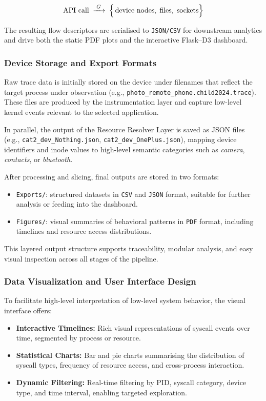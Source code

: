 \documentclass[a4paper,12pt]{report}
\begin{document}
\[
  \text{API call} \;\xrightarrow{\;G\;}\;
  \Bigl\{\,
     \text{device nodes},\;
     \text{files},\;
     \text{sockets}
  \Bigr\}
\]

\noindent
The resulting flow descriptors are serialised to
\texttt{JSON/CSV} for downstream analytics and drive both the static
PDF plots and the interactive Flask–D3 dashboard.


\subsubsection{Device Storage and Export Formats}

Raw trace data is initially stored on the device under filenames that reflect the target process under observation (e.g., \texttt{photo\_remote\_phone.child2024.trace}). These files are produced by the instrumentation layer and capture low-level kernel events relevant to the selected application.

In parallel, the output of the Resource Resolver Layer is saved as JSON files (e.g., \texttt{cat2\_dev\_Nothing.json}, \texttt{cat2\_dev\_OnePlus.json}), mapping device identifiers and inode values to high-level semantic categories such as \emph{camera}, \emph{contacts}, or \emph{bluetooth}.

After processing and slicing, final outputs are stored in two formats:
\begin{itemize}
  \item \texttt{Exports/}: structured datasets in \texttt{CSV} and \texttt{JSON} format, suitable for further analysis or feeding into the dashboard.
  \item \texttt{Figures/}: visual summaries of behavioral patterns in \texttt{PDF} format, including timelines and resource access distributions.
\end{itemize}

This layered output structure supports traceability, modular analysis, and easy visual inspection across all stages of the pipeline.



\subsubsection{Data Visualization and User Interface Design}

To facilitate high-level interpretation of low-level system behavior, the visual interface offers:

\begin{itemize}
  \item \textbf{Interactive Timelines:} Rich visual representations of syscall events over time, segmented by process or resource.
  \item \textbf{Statistical Charts:} Bar and pie charts summarising the distribution of syscall types, frequency of resource access, and cross-process interaction.
  \item \textbf{Dynamic Filtering:} Real-time filtering by PID, syscall category, device type, and time interval, enabling targeted exploration.
\end{itemize}
\end{document}
